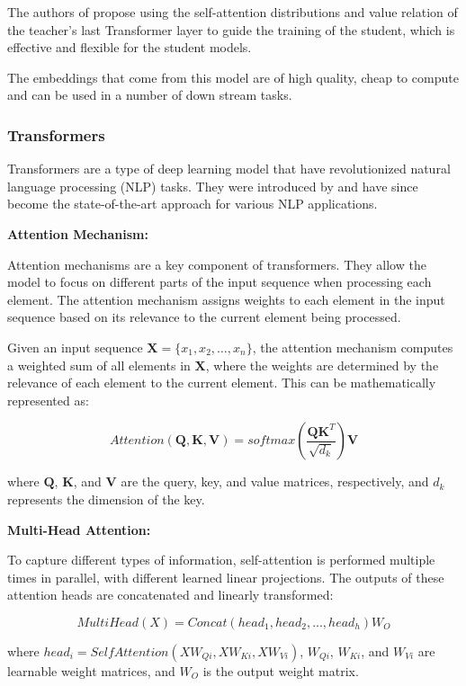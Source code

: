 \documentclass[a4paper,12pt]{article}
\begin{document}
The authors of \cite{minilm} propose using the self-attention distributions and value
relation of the teacher’s last Transformer layer to guide the
training of the student, which is effective and flexible for the student models. 

The embeddings that come from this model are of high quality, cheap to compute and can be used in a number of down stream tasks.

\subsubsection{Transformers}

Transformers are a type of deep learning model that have revolutionized natural language processing (NLP) tasks. They were introduced by \cite{attention} and have since become the state-of-the-art approach for various NLP applications.

\textbf{Attention Mechanism:}

Attention mechanisms are a key component of transformers. They allow the model to focus on different parts of the input sequence when processing each element. The attention mechanism assigns weights to each element in the input sequence based on its relevance to the current element being processed.

Given an input sequence $\mathbf{X} = \{x_1, x_2, \ldots, x_n\}$, the attention mechanism computes a weighted sum of all elements in $\mathbf{X}$, where the weights are determined by the relevance of each element to the current element. This can be mathematically represented as:

$$Attention(\mathbf{Q}, \mathbf{K}, \mathbf{V}) = softmax\left(\frac{\mathbf{QK}^T}{\sqrt{d_k}}\right) \mathbf{V}$$

where $\mathbf{Q}$, $\mathbf{K}$, and $\mathbf{V}$ are the query, key, and value matrices, respectively, and $d_k$ represents the dimension of the key.

\textbf{Multi-Head Attention:}

To capture different types of information, self-attention is performed multiple times in parallel, with different learned linear projections. The outputs of these attention heads are concatenated and linearly transformed:

$$
MultiHead(X) = Concat(head_1, head_2, ..., head_h)W_O
$$

where $head_i = SelfAttention(XW_{Qi}, XW_{Ki}, XW_{Vi})$, $W_{Qi}$, $W_{Ki}$, and $W_{Vi}$ are learnable weight matrices, and $W_O$ is the output weight matrix.
\end{document}
